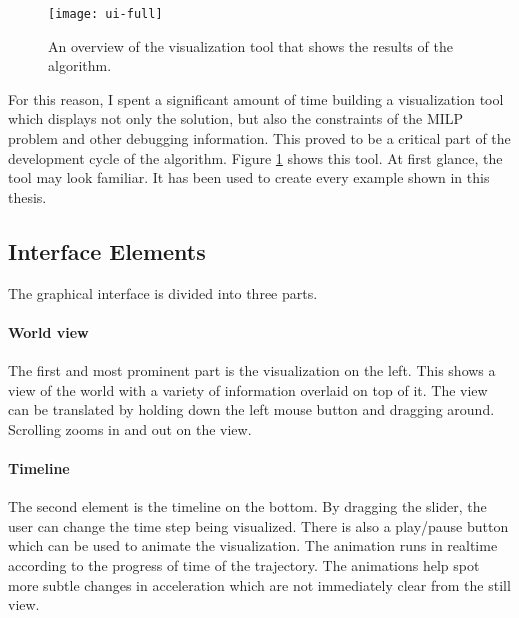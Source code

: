 \begin{figure}
	\centering
    \texttt{[image: ui-full]}
    \caption{An overview of the visualization tool that shows the results of the algorithm.}
    \label{fig:ui-full}     
\end{figure}

For this reason, I spent a significant amount of time building a visualization tool which displays not only the solution, but also the constraints of the MILP problem and other debugging information. This proved to be a critical part of the development cycle of the algorithm. Figure \ref{fig:ui-full} shows this tool. At first glance, the tool may look familiar. It has been used to create every example shown in this thesis. 
\subsection{Interface Elements}
The graphical interface is divided into three parts.

\paragraph{World view}The first and most prominent part is the visualization on the left. This shows a view of the world with a variety of information overlaid on top of it. The view can be translated by holding down the left mouse button and dragging around. Scrolling zooms in and out on the view.

\paragraph{Timeline}The second element is the timeline on the bottom. By dragging the slider, the user can change the time step being visualized. There is also a play/pause button which can be used to animate the visualization. The animation runs in realtime according to the progress of time of the trajectory. The animations help spot more subtle changes in acceleration which are not immediately clear from the still view.

